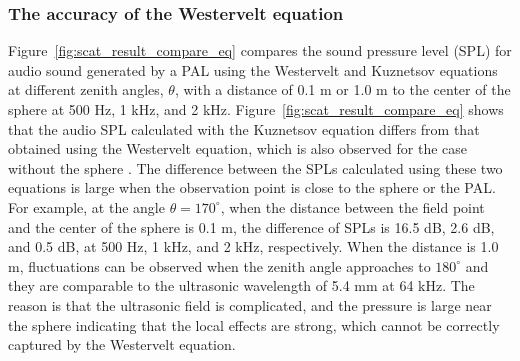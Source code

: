 \subsubsection{The accuracy of the Westervelt equation}
Figure~\ref{fig:scat_result_compare_eq} compares the sound pressure level (SPL) for audio sound generated by a PAL using the Westervelt and Kuznetsov equations at different zenith angles, $\theta$, with a distance of 0.1 m or 1.0 m to the center of the sphere at 500 Hz, 1 kHz, and 2 kHz. 
Figure~\ref{fig:scat_result_compare_eq} shows that the audio SPL calculated with the Kuznetsov equation differs from that  obtained using the Westervelt equation, which is also observed for the case without the sphere \cite{Cervenka2019VersatileComputationalApproach, Zhong2021FieldWesterveltFar}. 
The difference between the SPLs calculated using these two equations is large when the observation point is close to the sphere or the PAL. 
For example, at the angle $\theta = 170^\circ$, when the distance between the field point and the center of the sphere is 0.1 m, the difference of SPLs is 16.5 dB, 2.6 dB, and 0.5 dB, at 500 Hz, 1 kHz, and 2 kHz, respectively. When the distance is 1.0 m, fluctuations can be observed when the zenith angle approaches to $180^\circ$ and they are comparable to the ultrasonic wavelength of 5.4 mm at 64 kHz. 
The reason is that the ultrasonic field is complicated, and the pressure is large near the sphere indicating that the local effects are strong, which cannot be correctly captured by the Westervelt equation. 

